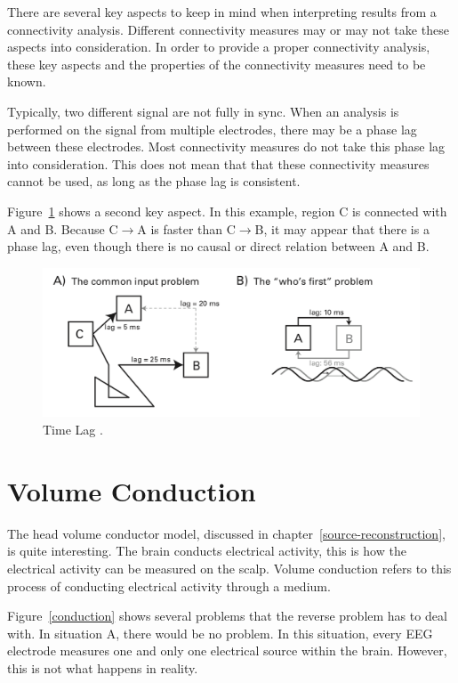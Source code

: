 There are several key aspects to keep in mind when interpreting results from a connectivity analysis. Different connectivity measures may or may not take these aspects into consideration. In order to provide a proper connectivity analysis, these key aspects and the properties of the connectivity measures need to be known.

Typically, two different signal are not fully in sync. When an analysis is performed on the signal from multiple electrodes, there may be a phase lag between these electrodes. Most connectivity measures do not take this phase lag into consideration. This does not mean that that these connectivity measures cannot be used, as long as the phase lag is consistent. \cite{horwitz2003elusive}

Figure~\ref{timelag} shows a second key aspect. In this example, region C is connected with A and B. Because C$\rightarrow$A is faster than C$\rightarrow$B, it may appear that there is a phase lag, even though there is no causal or direct relation between A and B.

\begin{figure}[!htb]
\caption{Time Lag \cite{cohen2014analyzing}.}
\label{timelag}
    \centering
    \includegraphics[width=\textwidth]{fig/timelag}
\end{figure}

\section{Volume Conduction}

The head volume conductor model, discussed in chapter~\ref{source-reconstruction}, is quite interesting. The brain conducts electrical activity, this is how the electrical activity can be measured on the scalp. Volume conduction refers to this process of conducting electrical activity through a medium. \cite{brunner2016volume}

Figure~\ref{conduction} shows several problems that the reverse problem has to deal with. In situation A, there would be no problem. In this situation, every EEG electrode measures one and only one electrical source within the brain. However, this is not what happens in reality. 


